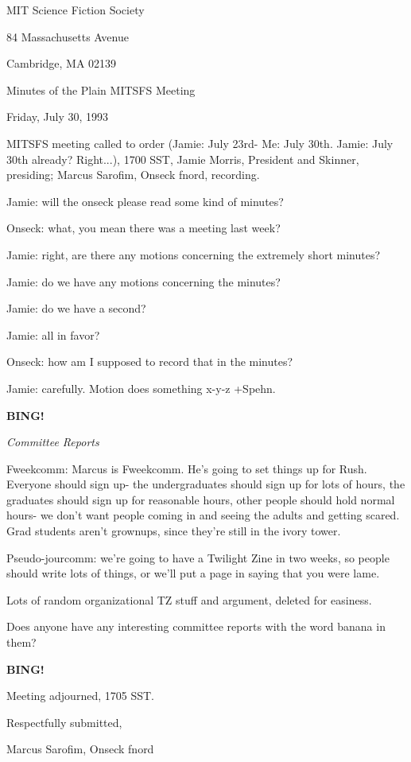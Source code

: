 \documentclass[12pt]{article}
\newcommand{\bing}{{\bf BING!} }
\newcommand{\goto}[1]{\bing \vskip 12pt \centerline{{\em{#1}}}}
\begin{document}
\begin{center}

MIT Science Fiction Society 

84 Massachusetts Avenue

Cambridge, MA 02139

\vspace{12pt}

Minutes of the Plain MITSFS Meeting

Friday, July 30, 1993

\end{center}
 
\vspace{18pt}

\setlength{\parskip}{6pt}

\noindent
MITSFS meeting called to order (Jamie: July 23rd- Me: July 30th. Jamie: July 30th already? Right...), 1700 SST, Jamie Morris, President and Skinner, presiding; Marcus Sarofim, Onseck fnord, recording.

Jamie: will the onseck please read some kind of minutes?

Onseck: what, you mean there was a meeting last week?

Jamie: right, are there any motions concerning the extremely short minutes?

Jamie: do we have any motions concerning the minutes?

Jamie: do we have a second?

Jamie: all in favor?

Onseck: how am I supposed to record that in the minutes?

Jamie: carefully. Motion does something x-y-z +Spehn.

\goto{Committee Reports}

Fweekcomm: Marcus is Fweekcomm. He's going to set things up for Rush. Everyone should sign up- the undergraduates should sign up for lots of hours, the graduates should sign up for reasonable hours, other people should hold normal hours- we don't want people coming in and seeing the adults and getting scared. Grad students aren't grownups, since they're still in the ivory tower.

Pseudo-jourcomm: we're going to have a Twilight Zine in two weeks, so people should write lots of things, or we'll put a page in saying that you were lame.

Lots of random organizational TZ stuff and argument, deleted for easiness.

Does anyone have any interesting committee reports with the word banana in them?

\bing

\vspace{12pt}

\noindent
Meeting adjourned, 1705 SST.

\vspace{18pt}

\centerline{Respectfully submitted,}
\centerline{Marcus Sarofim, Onseck fnord}
\end{document}
